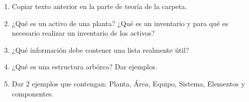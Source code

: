 \documentclass[../main]{subfiles}
\begin{document}
\begin{enumerate}
    \item Copiar texto anterior en la parte de teoría de la carpeta.
    \item ¿Qué es un activo de una planta? ¿Qué es un inventario y para qué es necesario realizar un inventario de los activos?
    \item ¿Qué información debe contener una lista realmente útil?
    \item ¿Qué es una estructura arbórea? Dar ejemplos.
    \item Dar 2 ejemplos que contengan: Planta, Área, Equipo, Sistema, Elementos y componentes.
    
\end{enumerate}
\end{document}
